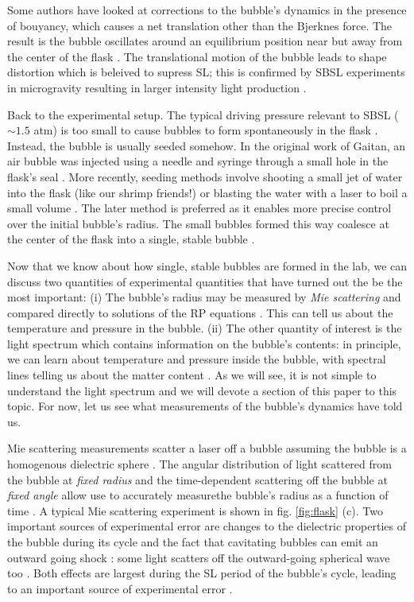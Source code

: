 \documentclass[rmp,aps,nofootinbib,superscriptaddress,floatfix]{revtex4-2}
\begin{document}
Some authors have looked at corrections to the bubble's dynamics in the presence of bouyancy, which causes a net translation other than the Bjerknes force. The result is the bubble oscillates around an equilibrium position near but away from the center of the flask \cite{matula2000single,matula1997bjerknes,matula1999inertial}. The translational motion of the bubble leads to shape distortion which is beleived to supress SL; this is confirmed by SBSL experiments in microgravity resulting in larger intensity light production \cite{matula2000single}.

Back to the experimental setup. The typical driving pressure relevant to SBSL ($\sim 1.5$ atm) is too small to cause bubbles to form spontaneously in the flask \cite{}. Instead, the bubble is usually seeded somehow. In the original work of Gaitan, an air bubble was injected using a needle and syringe through a small hole in the flask's seal \cite{gaitan1992sonoluminescence}. More recently, seeding methods involve shooting a small jet of water into the flask (like our shrimp friends!) or blasting the water with a laser to boil a small volume \cite{}. The later method is preferred as it enables more precise control over the initial bubble's radius. The small bubbles formed this way coalesce at the center of the flask into a single, stable bubble \cite{}.

Now that we know about how single, stable bubbles are formed in the lab, we can discuss two quantities of experimental quantities that have turned out the be the most important: (i) The bubble's radius may be measured by \emph{Mie scattering} and compared directly to solutions of the RP equations \cite{}. This can tell us about the temperature and pressure in the bubble. (ii) The other quantity of interest is the light spectrum which contains information on the bubble's contents: in principle, we can learn about temperature and pressure inside the bubble, with spectral lines telling us about the matter content \cite{}. As we will see, it is not simple to understand the light spectrum \cite{} and we will devote a section of this paper to this topic. For now, let us see what measurements of the bubble's dynamics have told us. 

Mie scattering measurements scatter a laser off a bubble assuming the bubble is a homogenous dielectric sphere \cite{}. The angular distribution of light scattered from the bubble at \emph{fixed radius} and the time-dependent scattering off the bubble at \emph{fixed angle} allow use to accurately measurethe bubble's radius as a function of time \cite{}. A typical Mie scattering experiment is shown in fig. \ref{fig:flask} (c). Two important sources of experimental error are changes to the dielectric properties of the bubble during its cycle \cite{} and the fact that cavitating bubbles can emit an outward going shock \cite{}: some light scatters off the outward-going spherical wave too \cite{}. Both effects are largest during the SL period of the bubble's cycle, leading to an important source of experimental error \cite{}. 
\end{document}
